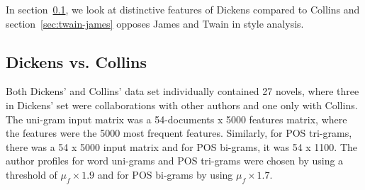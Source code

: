 \documentclass[a4paper,10pt,twoside,fleqn]{article}
\begin{document}
In section~\ref{sec:dickens-collins}, we look at distinctive
features of Dickens compared to Collins and section~\ref{sec:twain-james}
opposes James and Twain in style analysis. 

\subsection{Dickens vs. Collins} \label{sec:dickens-collins}
Both Dickens' and Collins' data set individually contained 27 novels,
where three in Dickens' set were collaborations with other authors and 
one only with Collins. The uni-gram input matrix was a 
54-documents x 5000 features matrix, where the features were 
the 5000 most frequent features. 
Similarly, for POS tri-grams, there was a 54 x 5000 input matrix and
for POS bi-grams, it was 54 x 1100. 
The author profiles for word uni-grams and POS tri-grams were chosen
by using a threshold of $\mu_f \times 1.9$ and for
POS bi-grams by using $\mu_f \times 1.7$. 
\end{document}
